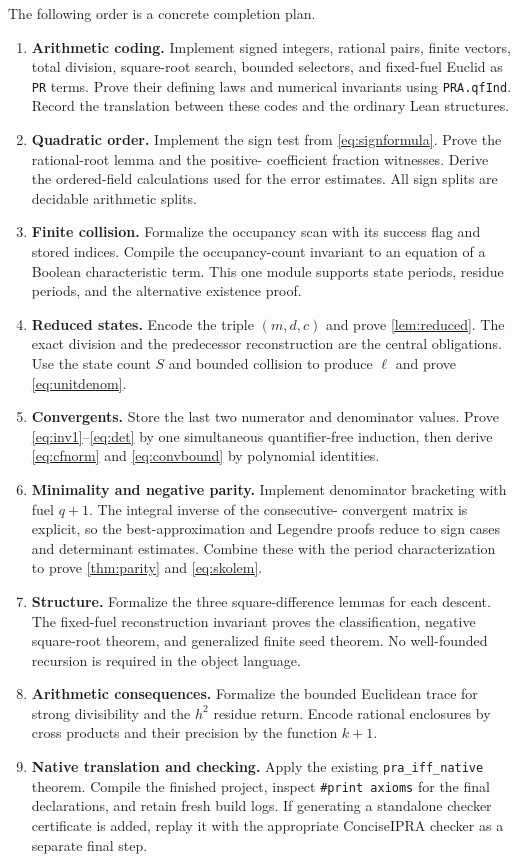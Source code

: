 \documentclass[11pt,letterpaper]{article}
\theoremstyle{definition}
\newcommand{\code}[1]{\texttt{#1}}
\begin{document}
The following order is a concrete completion plan.
\begin{enumerate}
\item \textbf{Arithmetic coding.} Implement signed integers, rational pairs,
finite vectors, total division, square-root search, bounded selectors, and
fixed-fuel Euclid as \code{PR} terms. Prove their defining laws and numerical
invariants using \code{PRA.qfInd}. Record the translation between these
codes and the ordinary Lean structures.
\item \textbf{Quadratic order.} Implement the sign test from
\eqref{eq:signformula}. Prove the rational-root lemma and the positive-
coefficient fraction witnesses. Derive the ordered-field calculations used
for the error estimates. All sign splits are decidable arithmetic splits.
\item \textbf{Finite collision.} Formalize the occupancy scan with its
success flag and stored indices. Compile the occupancy-count invariant to
an equation of a Boolean characteristic term. This one module supports
state periods, residue periods, and the alternative existence proof.
\item \textbf{Reduced states.} Encode the triple $(m,d,c)$ and prove
\cref{lem:reduced}. The exact division and the predecessor reconstruction
are the central obligations. Use the state count $S$ and bounded collision
to produce $\ell$ and prove \eqref{eq:unitdenom}.
\item \textbf{Convergents.} Store the last two numerator and denominator
values. Prove \eqref{eq:inv1}--\eqref{eq:det} by one simultaneous
quantifier-free induction, then derive \eqref{eq:cfnorm} and
\eqref{eq:convbound} by polynomial identities.
\item \textbf{Minimality and negative parity.} Implement denominator
bracketing with fuel $q+1$. The integral inverse of the consecutive-
convergent matrix is explicit, so the best-approximation and Legendre
proofs reduce to sign cases and determinant estimates. Combine these with
the period characterization to prove \cref{thm:parity} and
\eqref{eq:skolem}.
\item \textbf{Structure.} Formalize the three square-difference lemmas
for each descent. The fixed-fuel reconstruction invariant proves the
classification, negative square-root theorem, and generalized finite seed
theorem. No well-founded recursion is required in the object language.
\item \textbf{Arithmetic consequences.} Formalize the bounded Euclidean
trace for strong divisibility and the $h^2$ residue return. Encode rational
enclosures by cross products and their precision by the function $k+1$.
\item \textbf{Native translation and checking.} Apply the existing
\code{pra\_iff\_native} theorem. Compile the finished project, inspect
\code{\#print axioms} for the final declarations, and retain fresh build
logs. If generating a standalone checker certificate is added, replay it
with the appropriate ConciseIPRA checker as a separate final step.
\end{enumerate}
\end{document}
